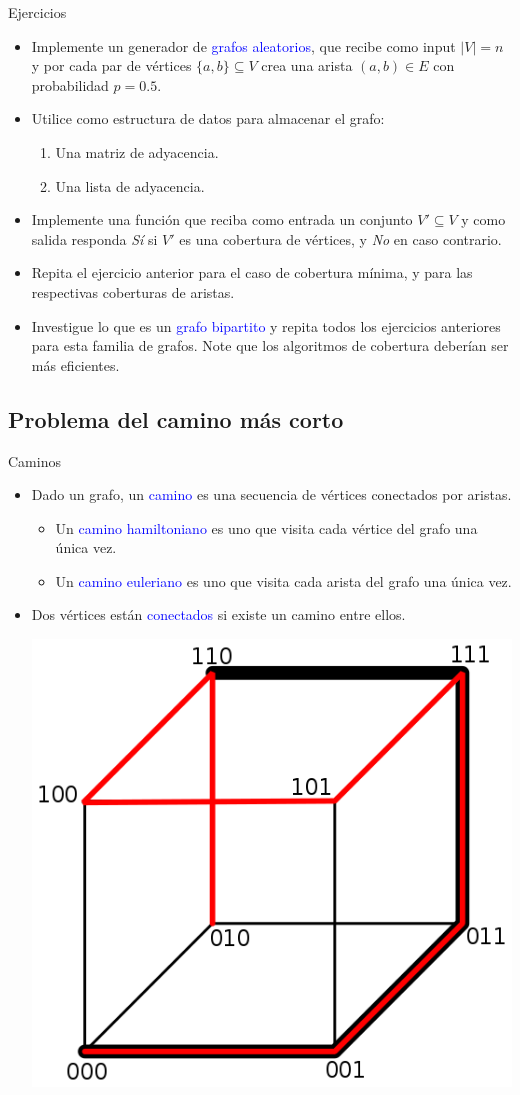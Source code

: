 \documentclass{beamer} %
\newcommand{\blue}[1]{\textcolor{blue}{#1}}
\begin{document}
\begin{frame}{Ejercicios}
    \begin{itemize}
        \item Implemente un generador de \blue{grafos aleatorios}, que recibe como input $|V|=n$ y por cada par de vértices $\{a,b\}\subseteq V$ crea una arista $(a,b)\in E$ con probabilidad $p=0.5$.
        \item Utilice como estructura de datos para almacenar el grafo:
        \begin{enumerate}
            \item Una matriz de adyacencia.
            \item Una lista de adyacencia.
        \end{enumerate}
        \item Implemente una función que reciba como entrada un conjunto $V'\subseteq V$ y como salida responda {\em Sí} si $V'$ es una cobertura de vértices, y {\em No} en caso contrario.
        \item Repita el ejercicio anterior para el caso de cobertura mínima, y para las respectivas coberturas de aristas.
        \item Investigue lo que es un \blue{grafo bipartito} y repita todos los ejercicios anteriores para esta familia de grafos. Note que los algoritmos de cobertura deberían ser más eficientes.
    \end{itemize}
\end{frame}

\subsection{Problema del camino más corto}

\begin{frame}{Caminos}
    \begin{itemize}
        \item<1-> Dado un grafo, un \blue{camino} es una secuencia de vértices conectados por aristas.
        \begin{itemize}
            \item<2-> Un \blue{camino hamiltoniano} es uno que visita cada vértice del grafo una única vez.
            \item<3-> Un \blue{camino euleriano} es uno que visita cada arista del grafo una única vez.
        \end{itemize}
        \item<4-> Dos vértices están \blue{conectados} si existe un camino entre ellos.
        \begin{center}
        \includegraphics[width=.3\textwidth]{./image/cap6/camino.png}
        \end{center}
    \end{itemize}
\end{frame}
\end{document}

